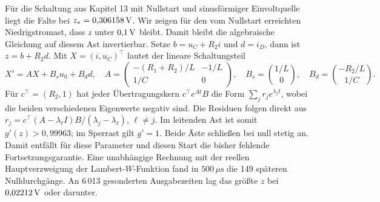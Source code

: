 Für die Schaltung aus Kapitel 13 mit Nullstart und sinusförmiger Einvoltquelle liegt die Falte bei \(z_*=0{,}306158\,\mathrm{V}\). Wir zeigen für den vom Nullstart erreichten Niedrigstromast, dass \(z\) unter \(0{,}1\,\mathrm{V}\) bleibt. Damit bleibt die algebraische Gleichung auf diesem Ast invertierbar.
Setze \(b=u_C+R_2i\) und \(d=i_D\), dann ist \(z=b+R_2d\). Mit \(X=(i,u_C)^\top\) lautet der lineare Schaltungsteil
\[
 X'=AX+B_su_0+B_dd,\quad
 A=\begin{pmatrix}-(R_1+R_2)/L&-1/L\\1/C&0\end{pmatrix},
 \quad B_s=\binom{1/L}{0},\quad B_d=\binom{-R_2/L}{1/C}.
\]
Für \(c^\top=(R_2,1)\) hat jeder Übertragungskern \(c^\top e^{At}B\) die Form \(\sum_j r_j e^{\lambda_jt}\), wobei die beiden verschiedenen Eigenwerte negativ sind. Die Residuen folgen direkt aus \(r_j=c^\top(A-\lambda_\ell I)B/(\lambda_j-\lambda_\ell)\), \(\ell\ne j\).
Im leitenden Ast ist somit \(g'(z)>0{,}99963\); im Sperrast gilt \(g'=1\). Beide Äste schließen bei null stetig an. Damit entfällt für diese Parameter und diesen Start die bisher fehlende Fortsetzungsgarantie. Eine unabhängige Rechnung mit der reellen Hauptverzweigung der Lambert-\(W\)-Funktion fand in \(500\,\mu\mathrm s\) die 149 späteren Nulldurchgänge. An 6\,013 gesonderten Ausgabezeiten lag das größte \(z\) bei \(0{,}02212\,\mathrm{V}\) oder darunter.

